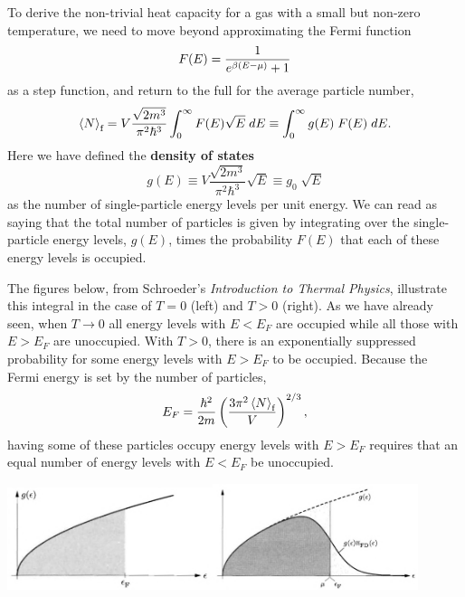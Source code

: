 To derive the non-trivial heat capacity for a gas with a small but non-zero temperature, we need to move beyond approximating the Fermi function
\begin{equation*}
  F(E) = \frac{1}{e^{\beta(E - \mu)} + 1}
\end{equation*}
as a step function, and return to the full  for the average particle number,
\begin{equation}
  \label{eq:number}
  \left\langle N \right\rangle_{\text{f}} = V \frac{\sqrt{2m^3}}{\pi^2 \hbar^3} \int_0^{\infty} F(E) \sqrt{E} \; dE \equiv \int_0^{\infty} g(E) \; F(E) \; dE.
\end{equation}
Here we have defined the \textbf{density of states}
\begin{equation*}
  g(E) \equiv V \frac{\sqrt{2m^3}}{\pi^2 \hbar^3} \sqrt{E} \equiv g_0 \; \sqrt{E}
\end{equation*}
as the number of single-particle energy levels per unit energy.
We can read  as saying that the total number of particles is given by integrating over the single-particle energy levels, $g(E)$, times the probability $F(E)$ that each of these energy levels is occupied.

The figures below, from Schroeder's \textit{Introduction to Thermal Physics}, illustrate this integral in the case of $T = 0$ (left) and $T > 0$ (right).
As we have already seen, when $T \to 0$ all energy levels with $E < E_F$ are occupied while all those with $E > E_F$ are unoccupied.
With $T > 0$, there is an exponentially suppressed probability for some energy levels with $E > E_F$ to be occupied.
Because the Fermi energy is set by the number of particles,
\begin{equation*}
  E_F = \frac{\hbar^2}{2m}\left(\frac{3\pi^2 \left\langle N \right\rangle_{\text{f}}}{V}\right)^{2 / 3},
\end{equation*}
having some of these particles occupy energy levels with $E > E_F$ requires that an equal number of energy levels with $E < E_F$ be unoccupied.

\noindent\includegraphics[width=0.45\textwidth]{figs/unit08_zero.pdf}\hfill \includegraphics[width=0.45\textwidth]{figs/unit08_nonzero.pdf}

